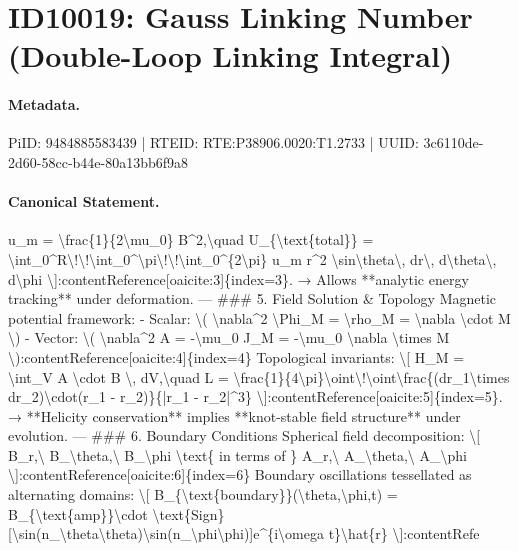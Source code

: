 \section*{ID10019: Gauss Linking Number (Double-Loop Linking Integral)}
\paragraph{Metadata.}
PiID: 9484885583439 | RTEID: RTE:P38906.0020:T1.2733 | UUID: 3c6110de-2d60-58cc-b44e-80a13bb6f9a8

\paragraph{Canonical Statement.}
u\_m = \textbackslash{}frac\{1\}\{2\textbackslash{}mu\_0\} B\textasciicircum{}2,\textbackslash{}quad U\_\{\textbackslash{}text\{total\}\} = \textbackslash{}int\_0\textasciicircum{}R\textbackslash{}!\textbackslash{}!\textbackslash{}int\_0\textasciicircum{}\textbackslash{}pi\textbackslash{}!\textbackslash{}!\textbackslash{}int\_0\textasciicircum{}\{2\textbackslash{}pi\} u\_m r\textasciicircum{}2 \textbackslash{}sin\textbackslash{}theta\textbackslash{}, dr\textbackslash{}, d\textbackslash{}theta\textbackslash{}, d\textbackslash{}phi \textbackslash{}]:contentReference[oaicite:3]\{index=3\}. → Allows **analytic energy tracking** under deformation. --- \#\#\# 5. Field Solution \& Topology Magnetic potential framework: - Scalar: \textbackslash{}( \textbackslash{}nabla\textasciicircum{}2 \textbackslash{}Phi\_M = \textbackslash{}rho\_M = \textbackslash{}nabla \textbackslash{}cdot M \textbackslash{}) - Vector: \textbackslash{}( \textbackslash{}nabla\textasciicircum{}2 A = -\textbackslash{}mu\_0 J\_M = -\textbackslash{}mu\_0 \textbackslash{}nabla \textbackslash{}times M \textbackslash{}):contentReference[oaicite:4]\{index=4\} Topological invariants: \textbackslash{}[ H\_M = \textbackslash{}int\_V A \textbackslash{}cdot B \textbackslash{}, dV,\textbackslash{}quad L = \textbackslash{}frac\{1\}\{4\textbackslash{}pi\}\textbackslash{}oint\textbackslash{}!\textbackslash{}oint\textbackslash{}frac\{(dr\_1\textbackslash{}times dr\_2)\textbackslash{}cdot(r\_1 - r\_2)\}\{|r\_1 - r\_2|\textasciicircum{}3\} \textbackslash{}]:contentReference[oaicite:5]\{index=5\}. → **Helicity conservation** implies **knot-stable field structure** under evolution. --- \#\#\# 6. Boundary Conditions Spherical field decomposition: \textbackslash{}[ B\_r,\textbackslash{} B\_\textbackslash{}theta,\textbackslash{} B\_\textbackslash{}phi \textbackslash{}text\{ in terms of \} A\_r,\textbackslash{} A\_\textbackslash{}theta,\textbackslash{} A\_\textbackslash{}phi \textbackslash{}]:contentReference[oaicite:6]\{index=6\} Boundary oscillations tessellated as alternating domains: \textbackslash{}[ B\_\{\textbackslash{}text\{boundary\}\}(\textbackslash{}theta,\textbackslash{}phi,t) = B\_\{\textbackslash{}text\{amp\}\}\textbackslash{}cdot \textbackslash{}text\{Sign\}[\textbackslash{}sin(n\_\textbackslash{}theta\textbackslash{}theta)\textbackslash{}sin(n\_\textbackslash{}phi\textbackslash{}phi)]e\textasciicircum{}\{i\textbackslash{}omega t\}\textbackslash{}hat\{r\} \textbackslash{}]:contentRefe

